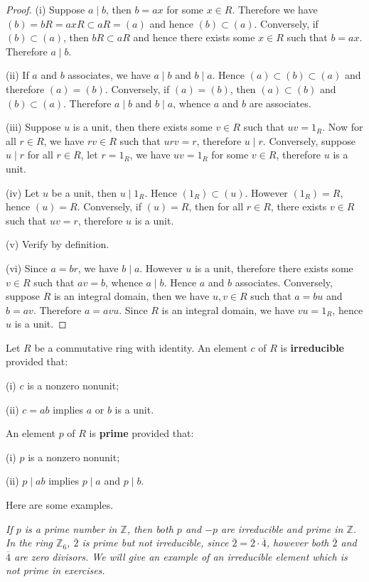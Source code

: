 \begin{proof}
(i) Suppose $a\mid b$, then $b=ax$ for some $x\in R$. Therefore we have $\left( b \right) =bR=axR\subset aR=\left( a \right) $ and hence $(b)\subset(a)$. Conversely, if $(b)\subset (a)$, then $bR\subset aR$ and hence there exists some $x\in R$ such that $b=ax$. Therefore $a\mid b$.\par
(ii) If $a$ and $b$ associates, we have $a\mid b$ and $b\mid a$. Hence $(a)\subset (b)\subset (a)$ and therefore $(a)=(b)$. Conversely, if $(a)=(b)$, then $(a)\subset (b)$ and $(b)\subset (a)$. Therefore $a\mid b$ and $b\mid a$, whence $a$ and $b$ are associates.\par
(iii) Suppose $u$ is a unit, then there exists some $v\in R$ such that $uv=1_R$. Now for all $r\in R$, we have $rv\in R$ such that $urv=r$, therefore $u\mid r$. Conversely, suppose $u\mid r$ for all $r\in R$, let $r=1_R$, we have $uv=1_R$ for some $v\in R$, therefore $u$ is a unit.\par
(iv) Let $u$ be a unit, then $u\mid 1_R$. Hence $(1_R)\subset (u)$. However $(1_R)=R$, hence $(u)=R$. Conversely, if $(u)=R$, then for all $r\in R$, there exists $v\in R$ such that $uv=r$, therefore $u$ is a unit.\par
(v) Verify by definition.\par
(vi) Since $a=br$, we have $b\mid a$. However $u$ is a unit, therefore there exists some $v\in R$ such that $av=b$, whence $a\mid b$. Hence $a$ and $b$ associates. Conversely, suppose $R$ is an integral domain, then we have $u,v\in R$ such that $a=bu$ and $b=av$. Therefore $a=avu$. Since $R$ is an integral domain, we have $vu=1_R$, hence $u$ is a unit.
\end{proof}
\begin{definition}
Let $R$ be a commutative ring with identity. An element $c$ of $R$ is \textbf{irreducible} provided that:\par
(i) $c$ is a nonzero nonunit;\par
(ii) $c=ab$ implies $a$ or $b$ is a unit.\par
An element $p$ of $R$ is \textbf{prime} provided that:\par
(i) $p$ is a nonzero nonunit;\par
(ii) $p\mid ab$ implies $p\mid a$ and $p\mid b$.
\end{definition}
Here are some examples.
\begin{example}\em
If $p$ is a prime number in $\mathbb{Z}$, then both $p$ and $-p$ are irreducible and prime in $\mathbb{Z}$. In the ring $\mathbb{Z}_6$, $\overline{2}$ is prime but not irreducible, since $\overline{2}=\overline{2}\cdot\overline{4}$, however both $\overline{2}$ and $\overline{4}$ are zero divisors. We will give an example of an irreducible element which is not prime in exercises.
\end{example}
